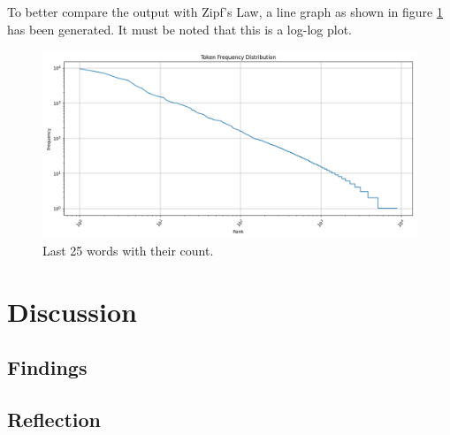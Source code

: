 \documentclass[titlepage]{article}
\begin{document}
To better compare the output with Zipf's Law, a line graph as shown in figure \ref{fig:FigLine} has 
been generated. It must be noted that this is a log-log plot.

\begin{figure}[H]
    \centering
    \includegraphics[width=\textwidth]{figures/line_plot.png}
    \caption{Last 25 words with their count.}
    \label{fig:FigLine}
\end{figure}

\section{Discussion}
\subsection{Findings}
\subsection{Reflection}
\end{document}
